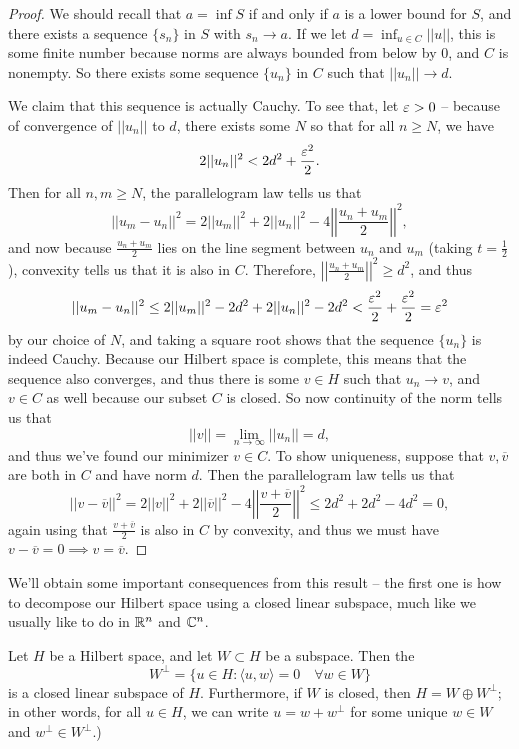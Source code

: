 \begin{proof}
We should recall that $a = \inf S$ if and only if $a$ is a lower bound for $S$, and there exists a sequence $\{s_n\}$ in $S$ with $s_n \to a$. If we let $d = \inf_{u \in C} ||u||$, this is some finite number because norms are always bounded from below by $0$, and $C$ is nonempty. So there exists some sequence $\{u_n\}$ in $C$ such that $||u_n|| \to d$. 

We claim that this sequence is actually Cauchy. To see that, let $\varepsilon > 0$ -- because of convergence of $||u_n||$ to $d$, there exists some $N$ so that for all $n \ge N$, we have 
\[
    2||u_n||^2 < 2d^2 + \frac{\varepsilon^2}{2}.
\] 
Then for all $n, m \ge N$, the parallelogram law tells us that
\[
    ||u_m - u_n||^2 = 2||u_m||^2 + 2||u_n||^2 - 4\left|\left|\frac{u_n + u_m}{2}\right|\right|^2,
\]
and now because $\frac{u_n + u_m}{2}$ lies on the line segment between $u_n$ and $u_m$ (taking $t = \frac{1}{2}$), convexity tells us that it is also in $C$. Therefore, $\left|\left|\frac{u_n + u_m}{2}\right|\right|^2 \ge d^2$, and thus
\[
    ||u_m - u_n||^2 \le 2||u_m||^2 - 2d^2 + 2||u_n||^2 - 2d^2 < \frac{\varepsilon^2}{2} + \frac{\varepsilon^2}{2} = \varepsilon^2
\]
by our choice of $N$, and taking a square root shows that the sequence $\{u_n\}$ is indeed Cauchy. Because our Hilbert space is complete, this means that the sequence also converges, and thus there is some $v \in H$ such that $u_n \to v$, and $v \in C$ as well because our subset $C$ is closed. So now continuity of the norm tells us that
\[
    ||v|| = \lim_{n \to \infty} ||u_n|| = d,
\]
and thus we've found our minimizer $v \in C$. To show uniqueness, suppose that $v, \overline{v}$ are both in $C$ and have norm $d$. Then the parallelogram law tells us that
\[
    ||v - \overline{v}||^2 = 2||v||^2 + 2||\overline{v}||^2 - 4\left|\left|\frac{v + \overline{v}}{2}\right|\right|^2 \le 2d^2 + 2d^2 - 4d^2 = 0,
\]
again using that $\frac{v + \overline{v}}{2}$ is also in $C$ by convexity, and thus we must have $v - \overline{v} = 0 \implies v = \overline{v}$.
\end{proof}

We'll obtain some important consequences from this result -- the first one is how to decompose our Hilbert space using a closed linear subspace, much like we usually like to do in $\mathbb R^n$ and $\mathbb C^n$.

\begin{theorem}\label{orthocomplement}
Let $H$ be a Hilbert space, and let $W \subset H$ be a subspace. Then the 
\[
    W^\perp = \{u \in H: \langle u, w \rangle = 0 \quad \forall w \in W\}
\]
is a closed linear subspace of $H$. Furthermore, if $W$ is closed, then $H = W \oplus W^\perp$; in other words, for all $u \in H$, we can write $u = w + w^\perp$ for some unique $w \in W$ and $w^\perp \in W^\perp$.)
\end{theorem}

